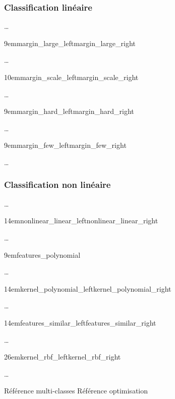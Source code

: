 \subsubsection{Classification linéaire}

…

{9em}{margin_large_left}{margin_large_right}

…

{10em}{margin_scale_left}{margin_scale_right}

…

{9em}{margin_hard_left}{margin_hard_right}

…

{9em}{margin_few_left}{margin_few_right}

…

\subsubsection{Classification non linéaire}

…

{14em}{nonlinear_linear_left}{nonlinear_linear_right}

…

{9em}{features_polynomial}

…

{14em}{kernel_polynomial_left}{kernel_polynomial_right}

…

{14em}{features_similar_left}{features_similar_right}

…

{26em}{kernel_rbf_left}{kernel_rbf_right}

…

Référence multi-classes \cite{multi-class}
Référence optimisation \cite{mri} \cite{optimization}

\pagebreak
